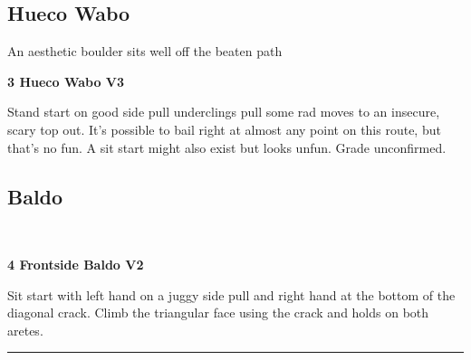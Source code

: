 \begin{multicols}{2}
			\subsection*{Hueco Wabo}\label{bf:Hueco Wabo}
			\begin{minipage}{\columnwidth}
			An aesthetic boulder sits well off the beaten path
			\end{minipage}
			

					\begin{minipage}{\linewidth}	
					\label{rt:Hueco Wabo}\colorbox{green!20}{\textbf{3 Hueco Wabo V3  }}
					\begin{adjustwidth}{0.5cm}{}				
					Stand start on good side pull underclings pull some rad moves to an insecure, scary top out. It's possible to bail right at almost any point on this route, but that's no fun. A sit start might also exist but looks unfun. Grade unconfirmed.
					\end{adjustwidth}
					\end{minipage}
			\subsection*{Baldo}\label{bf:Baldo}
			\begin{minipage}{\columnwidth}
			\
			\end{minipage}
			

					\begin{minipage}{\linewidth}	
					\label{rt:Frontside Baldo}\colorbox{green!20}{\textbf{4 Frontside Baldo V2    }}
					\begin{adjustwidth}{0.5cm}{}				
					Sit start with left hand on a juggy side pull and right hand at the bottom of the diagonal crack. Climb the triangular face using the crack and holds on both aretes.
					\end{adjustwidth}
					\end{minipage}
\end{multicols}
\rule{\textwidth}{1pt}
